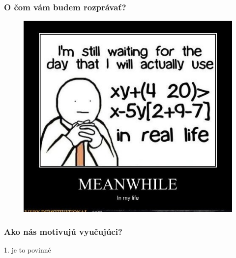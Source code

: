 \documentclass{beamer}
\begin{document}
\begin{frame}
\frametitle{O čom vám budem rozprávať?}
\begin{figure}
\includegraphics[height=0.8\textheight]{images/wait_to_use.jpg}
\end{figure}
\end{frame}

\begin{frame}
\frametitle{Ako nás motivujú vyučujúci?}
\begin{center}
{\Large 1. je to povinné}
\end{center}
\end{frame}
\end{document}
